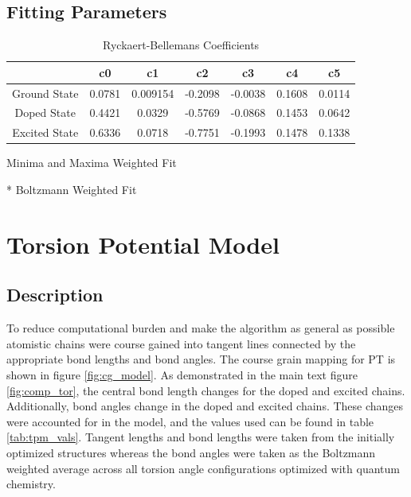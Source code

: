 \subsection{Fitting Parameters}
\begin{table}[hbt!]\centering
\caption{Ryckaert-Bellemans Coefficients}
\renewcommand{\arraystretch}{1.5}
\begin{threeparttable}
\begin{tabular}{ccccccc}\toprule
\multicolumn{1}{c}{\multirow{1}{3.5cm}{\centering}} &
\multicolumn{1}{c}{\multirow{1}{1.5cm}{\centering c0}} &
\multicolumn{1}{c}{\multirow{1}{1.5cm}{\centering c1}} &
\multicolumn{1}{c}{\multirow{1}{1.5cm}{\centering c2}} &
\multicolumn{1}{c}{\multirow{1}{1.5cm}{\centering c3}} &
\multicolumn{1}{c}{\multirow{1}{1.5cm}{\centering c4}} &
\multicolumn{1}{c}{\multirow{1}{1.5cm}{\centering c5}} \\ \midrule
    Ground State\tnote{\textdagger} & 0.0781 & 0.009154 & -0.2098 & -0.0038 & 0.1608 & 0.0114\\
    Doped State\tnote{*} & 0.4421 & 0.0329 & -0.5769 & -0.0868 & 0.1453 & 0.0642\\
    Excited State\tnote{*} & 0.6336 & 0.0718 & -0.7751 & -0.1993 & 0.1478 & 0.1338\\ \bottomrule
\end{tabular}
\begin{tablenotes}
\item[\textdagger] \footnotesize Minima and Maxima Weighted Fit
\item[*] \footnotesize Boltzmann Weighted Fit
\end{tablenotes}
\end{threeparttable}
\end{table}

\section{Torsion Potential Model}
\label{sec:TPM}
\subsection{Description}
To reduce computational burden and make the algorithm as general as possible atomistic chains were course gained into tangent lines connected by the appropriate bond lengths and bond angles. The course grain mapping for PT is shown in figure \ref{fig:cg_model}. As demonstrated in the main text figure \ref{fig:comp_tor}, the central bond length changes for the doped and excited chains. Additionally, bond angles change in the doped and excited chains. These changes were accounted for in the model, and the values used can be found in table \ref{tab:tpm_vals}. Tangent lengths and bond lengths were taken from the initially optimized structures whereas the bond angles were taken as the Boltzmann weighted average across all torsion angle configurations optimized with quantum chemistry.

